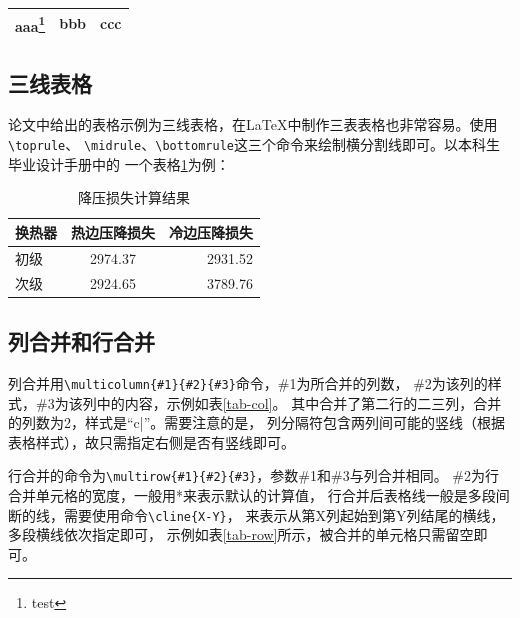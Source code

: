 \begin{minipage}[h]{\textwidth}
    \begin{tabular}{|c|c|c|}
        \hline
        aaa\footnote{test} & bbb & ccc \\
        \hline
    \end{tabular}
\end{minipage}

\subsection{三线表格}
\label{three-line-table}

论文中给出的表格示例为三线表格，在\LaTeX{}中制作三表表格也非常容易。使用\verb|\toprule|、
\verb|\midrule|、\verb|\bottomrule|这三个命令来绘制横分割线即可。以本科生毕业设计手册中的
一个表格\ref{tab-three-line-table-example}为例：

\begin{table}
    \centering
    \caption{降压损失计算结果}
    \label{tab-three-line-table-example}
    \begin{tabular}{lcr}
        \toprule
        换热器 & 热边压降损失 & 冷边压降损失 \\
        \midrule
        初级   & 2974.37      & 2931.52      \\
        次级   & 2924.65      & 3789.76      \\
        \bottomrule
    \end{tabular}
\end{table}

\subsection{列合并和行合并}
\label{subsec-tab-col-row}
列合并用\verb|\multicolumn{#1}{#2}{#3}|命令，\#1为所合并的列数，
\#2为该列的样式，\#3为该列中的内容，示例如表\ref{tab-col}。
其中合并了第二行的二三列，合并的列数为2，样式是“c|”。需要注意的是，
列分隔符包含两列间可能的竖线（根据表格样式），故只需指定右侧是否有竖线即可。

行合并的命令为\verb|\multirow{#1}{#2}{#3}|，参数\#1和\#3与列合并相同。
\#2为行合并单元格的宽度，一般用*来表示默认的计算值，
行合并后表格线一般是多段间断的线，需要使用命令\verb|\cline{X-Y}|，
来表示从第X列起始到第Y列结尾的横线，多段横线依次指定即可，
示例如表\ref{tab-row}所示，被合并的单元格只需留空即可。

